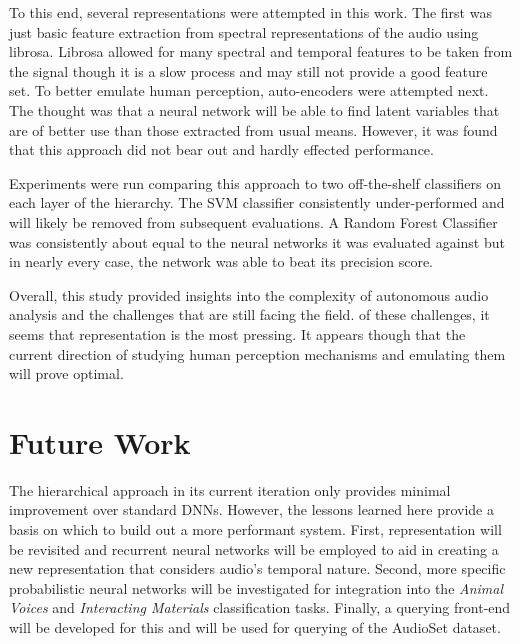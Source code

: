 To this end, several representations were attempted in this work. The first was just basic feature extraction from spectral representations of the audio using librosa. Librosa allowed for many spectral and temporal features to be taken from the signal though it is a slow process and may still not provide a good feature set. To better emulate human perception, auto-encoders were attempted next. The thought was that a neural network will be able to find latent variables that are of better use than those extracted from usual means. However, it was found that this approach did not bear out and hardly effected performance.

Experiments were run comparing this approach to two off-the-shelf classifiers on each layer of the hierarchy. The SVM classifier consistently under-performed and will likely be removed from subsequent evaluations. A Random Forest Classifier was consistently about equal to the neural networks it was evaluated against but in nearly every case, the network was able to beat its precision score.

Overall, this study provided insights into the complexity of autonomous audio analysis and the challenges that are still facing the field. of these challenges, it seems that representation is the most pressing. It appears though that the current direction of studying human perception mechanisms and emulating them will prove optimal.

\section{Future Work}

The hierarchical approach in its current iteration only provides minimal improvement over standard DNNs. However, the lessons learned here provide a basis on which to build out a more performant system. First, representation will be revisited and recurrent neural networks will be employed to aid in creating a new representation that considers audio's temporal nature. Second, more specific probabilistic neural networks will be investigated for integration into the \textit{Animal Voices} and \textit{Interacting Materials} classification tasks. Finally, a querying front-end will be developed for this and will be used for querying of the AudioSet dataset.